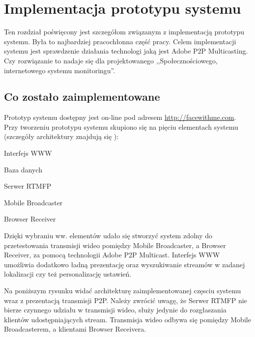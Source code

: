 \chapter{Implementacja prototypu systemu}
\label{cha:ImplementacjaPrototypu}

Ten rozdział poświęcony jest szczegółom związanym z implementacją prototypu systemu. Była to najbardziej pracochłonna część pracy. Celem implementacji systemu jest sprawdzenie działania technologi jaką jest Adobe P2P Multicasting. Czy rozwiązanie to nadaje się dla projektowanego ,,Społecznościowego, internetowego systemu monitoringu''.

\section{Co zostało zaimplementowane}
Prototyp systemu dostępny jest on-line pod adresem \url{http://facewithme.com}. Przy tworzeniu prototypu systemu skupiono się na pięciu elementach systemu (szczegóły architektury znajdują się ):

\begin{packed_item}
    \item{Interfejs WWW}
    \item{Baza danych}
    \item{Serwer RTMFP}
    \item{Mobile Broadcaster}
    \item{Browser Receiver}
\end{packed_item}

Dzięki wybraniu ww. elementów udało się stworzyć system zdolny do przetestowania transmisji wideo pomiędzy Mobile Broadcaster, a Browser Receiver, za pomocą technologii Adobe P2P Multicast. Interfejs WWW umożliwia dodatkowo ładną prezentację oraz wyszukiwanie streamów w zadanej lokalizacji czy też personalizację ustawień.

Na poniższym rysunku widać architekturę  zaimplementowanej częsciu systemu wraz z prezentacją transmisji P2P. Należy zwrócić uwagę, że Serwer RTMFP nie bierze czynnego udziału w transmisji wideo, służy jedynie do rozgłaszania klientów udostępniających stream. Transmisja wideo odbywa się pomiędzy Mobile Broadcasterem, a klientami Browser Receivera.

